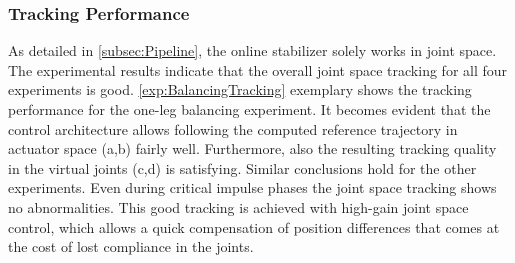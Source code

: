 \subsubsection{Tracking Performance}
As detailed in \cref{subsec:Pipeline}, the online stabilizer solely works in joint space. The experimental results indicate that the overall joint space tracking for all four experiments is good. 
\cref{exp:BalancingTracking} exemplary shows the tracking performance for the one-leg balancing experiment. It becomes evident that the control architecture allows following the computed reference trajectory in actuator space (a,b) fairly well. Furthermore, also the resulting tracking quality in the virtual joints (c,d) is satisfying. Similar conclusions hold for the other experiments. Even during critical impulse phases the joint space tracking shows no abnormalities. This good tracking is achieved with high-gain joint space control, which allows a quick compensation of position differences that comes at the cost of lost compliance in the joints.
